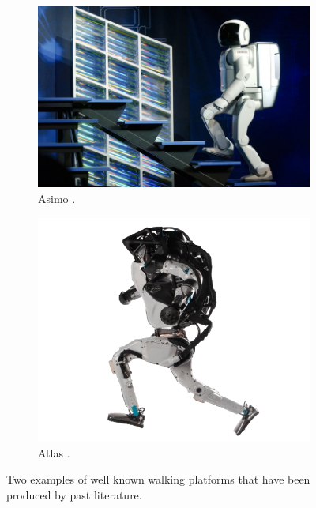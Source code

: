 \begin{figure}[!ht]
    \centering
    \begin{subfigure}[b]{0.4\textwidth}
        \centering
        \includegraphics[width=1\linewidth]{figs/asimo.png}
        \caption{Asimo \cite{Asimo-2018}.}
    \end{subfigure} 
    \hfill
    \begin{subfigure}[b]{0.4\textwidth}
        \centering
        \includegraphics[width=\linewidth]{figs/altals.png}
        \caption{Atlas \cite{Atlas-2019}.}
    \end{subfigure}
    \caption{Two examples of well known walking platforms that have been produced by past literature.}
    \label{fig:linear_sim}
\end{figure}

